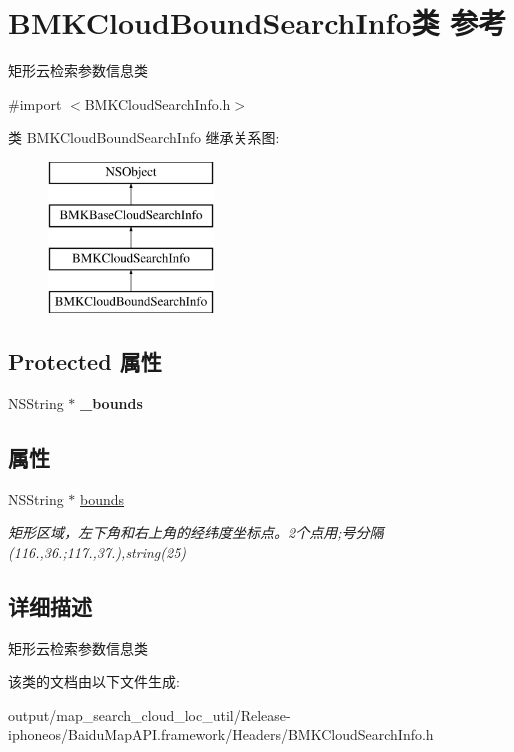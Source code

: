 \hypertarget{interface_b_m_k_cloud_bound_search_info}{}\section{B\+M\+K\+Cloud\+Bound\+Search\+Info类 参考}
\label{interface_b_m_k_cloud_bound_search_info}


矩形云检索参数信息类  




{\ttfamily \#import $<$B\+M\+K\+Cloud\+Search\+Info.\+h$>$}

类 B\+M\+K\+Cloud\+Bound\+Search\+Info 继承关系图\+:\begin{figure}[H]
\begin{center}
\leavevmode
\includegraphics[height=4.000000cm]{interface_b_m_k_cloud_bound_search_info}
\end{center}
\end{figure}
\subsection*{Protected 属性}
\begin{DoxyCompactItemize}
\item 
\hypertarget{interface_b_m_k_cloud_bound_search_info_aab508b50d538d64dbd6e45d3280aa1d9}{}N\+S\+String $\ast$ {\bfseries \+\_\+bounds}\label{interface_b_m_k_cloud_bound_search_info_aab508b50d538d64dbd6e45d3280aa1d9}

\end{DoxyCompactItemize}
\subsection*{属性}
\begin{DoxyCompactItemize}
\item 
\hypertarget{interface_b_m_k_cloud_bound_search_info_a23623d581d1b1e81766d9c46048966cb}{}N\+S\+String $\ast$ \hyperlink{interface_b_m_k_cloud_bound_search_info_a23623d581d1b1e81766d9c46048966cb}{bounds}\label{interface_b_m_k_cloud_bound_search_info_a23623d581d1b1e81766d9c46048966cb}

\begin{DoxyCompactList}\small\item\em 矩形区域，左下角和右上角的经纬度坐标点。2个点用;号分隔(116.,36.;117.,37.),string(25) \end{DoxyCompactList}\end{DoxyCompactItemize}


\subsection{详细描述}
矩形云检索参数信息类 

该类的文档由以下文件生成\+:\begin{DoxyCompactItemize}
\item 
output/map\+\_\+search\+\_\+cloud\+\_\+loc\+\_\+util/\+Release-\/iphoneos/\+Baidu\+Map\+A\+P\+I.\+framework/\+Headers/B\+M\+K\+Cloud\+Search\+Info.\+h\end{DoxyCompactItemize}
